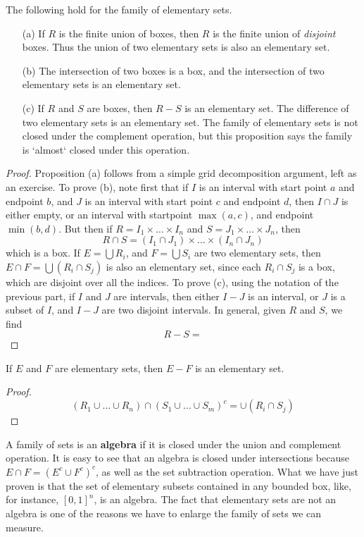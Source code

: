 \begin{theorem}
  The following hold for the family of elementary sets.
  \begin{enumerate}
      \item[(a)] If $R$ is the finite union of boxes, then $R$ is the finite union of {\it disjoint} boxes. Thus the union of two elementary sets is also an elementary set.
      \item[(b)] The intersection of two boxes is a box, and the intersection of two elementary sets is an elementary set.
      \item[(c)] If $R$ and $S$ are boxes, then $R - S$ is an elementary set. The difference of two elementary sets is an elementary set. The family of elementary sets is not closed under the complement operation, but this proposition says the family is `almost` closed under this operation.
  \end{enumerate}
\end{theorem}
\begin{proof}
  Proposition (a) follows from a simple grid decomposition argument, left as an exercise. To prove (b), note first that if $I$ is an interval with start point $a$ and endpoint $b$, and $J$ is an interval with start point $c$ and endpoint $d$, then $I \cap J$ is either empty, or an interval with startpoint $\max(a,c)$, and endpoint $\min(b,d)$. But then if $R = I_1 \times \dots \times I_n$ and $S = J_1 \times \dots \times J_n$, then
    \[ R \cap S = (I_1 \cap J_1) \times \dots \times (I_n \cap J_n) \]
    which is a box. If $E = \bigcup R_i$, and $F = \bigcup S_i$ are two elementary sets, then $E \cap F = \bigcup (R_i \cap S_j)$ is also an elementary set, since each $R_i \cap S_j$ is a box, which are disjoint over all the indices. To prove (c), using the notation of the previous part, if $I$ and $J$ are intervals, then either $I - J$ is an interval, or $J$ is a subset of $I$, and $I - J$ are two disjoint intervals. In general, given $R$ and $S$, we find
    \[ R - S =  \]
\end{proof}

\begin{corollary}
    If $E$ and $F$ are elementary sets, then $E - F$ is an elementary set.
\end{corollary}
\begin{proof}
    \[ (R_1 \cup \dots \cup R_n) \cap (S_1 \cup \dots \cup S_m)^c = \cup (R_i \cap S_j) \]
\end{proof}

A family of sets is an {\bf algebra} if it is closed under the union and complement operation. It is easy to see that an algebra is closed under intersections because $E \cap F = (E^c \cup F^c)^c$, as well as the set subtraction operation. What we have just proven is that the set of elementary subsets contained in any bounded box, like, for instance, $[0,1]^n$, is an algebra. The fact that elementary sets are not an algebra is one of the reasons we have to enlarge the family of sets we can measure.

